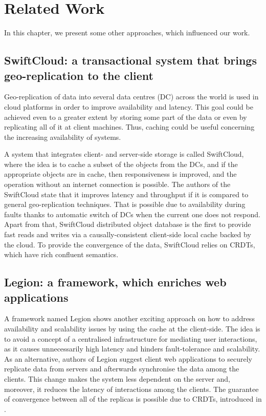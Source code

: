 \chapter{Related Work}
\label{RelatedWork}

In this chapter, we present some other approaches, which influenced our work. 

\section{SwiftCloud: a transactional system that brings geo-replication to the client}

Geo-replication of data into several data centres (DC) across the world is used in cloud platforms in order to improve availability and latency\cite{6}. This goal could be achieved even to a greater extent by storing some part of the data or even by replicating all of it at client machines. Thus, caching could be useful concerning the increasing availability of systems.

A system that integrates client- and server-side storage is called SwiftCloud, where the idea is to cache a subset of the objects from the DCs, and if the appropriate objects are in cache, then responsiveness is improved, and the operation without an internet connection is possible\cite{5}. The authors of the SwiftCloud state that it improves latency and throughput if it is compared to general geo-replication techniques. That is possible due to availability during faults thanks to automatic switch of DCs when the current one does not respond. Apart from that, SwiftCloud distributed object database is the first to provide fast reads and writes via a causally-consistent client-side local cache backed by the cloud. To provide the convergence of the data, SwiftCloud relies on CRDTs, which have rich confluent semantics\cite{7}.

\section{Legion: a framework, which enriches web applications}

A framework named Legion shows another exciting approach on how to address availability and scalability issues by using the cache at the client-side. The idea is to avoid a concept of a centralised infrastructure for mediating user interactions, as it causes unnecessarily high latency and hinders fault-tolerance and scalability\cite{8}. As an alternative, authors of Legion suggest client web applications to securely replicate data from servers and afterwards synchronise the data among the clients. This change makes the system less dependent on the server and, moreover, it reduces the latency of interactions among the clients. The guarantee of convergence between all of the replicas is possible due to CRDTs, introduced in . 

